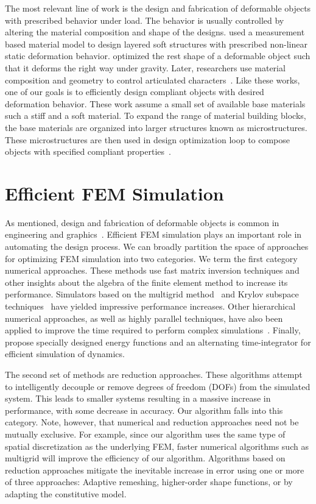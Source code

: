 The most relevant line of work is the design and fabrication of deformable objects with prescribed behavior under load.
The behavior is usually controlled by altering the material
composition and shape of the designs.
\citet{Bickel:2010:DAF} used a measurement based material model to design 
layered soft structures with prescribed non-linear static deformation behavior.
\citet{Chen:2014:ANM} optimized the rest shape of a deformable object such that 
it deforms the right way under gravity.
Later, researchers use material composition and geometry to control 
articulated characters~\citep{Bickel:2012,Skouras13Computational}.
Like these works, one of our goals is to efficiently design compliant objects 
with desired deformation behavior. These work assume a small set of available 
base materials such a stiff and a soft material.
To expand the range of material building blocks, the base materials are 
organized into larger structures known as microstructures.
These microstructures are then used in design optimization loop to 
compose objects with specified compliant 
properties~\citep{Schumacher:2015,Panetta:2015,Zhu:2017:TTO}.

\section{Efficient FEM Simulation}
As mentioned, design and fabrication of deformable objects is common in
engineering and graphics~\citep{bendsoe2004topology,Kou2012,McAdams2011}.
Efficient FEM simulation plays an important role in automating the design process.
We can broadly partition the space of approaches for
optimizing FEM simulation into two categories. We term the first
category numerical approaches. These methods use fast matrix inversion
techniques and other insights about the algebra of the finite
element method to increase its performance. Simulators based on
the multigrid method~\citep{Peraire1992,Zhu2010,McAdams2011}
and Krylov subspace techniques~\citep{Patterson2012}
have yielded impressive performance increases. Other hierarchical
numerical approaches, as well as highly parallel techniques, have
also been applied to improve the time required to perform complex
simulations~\citep{Farhat1991,Mandel1993}. Finally, \citet{Bouaziz:2014} propose specially designed energy functions and an
alternating time-integrator for efficient simulation of dynamics.

The second set of methods are reduction approaches. These algorithms
attempt to intelligently decouple or remove degrees of
freedom (DOFs) from the simulated system. This leads to smaller
systems resulting in a massive increase in performance, with some
decrease in accuracy. Our algorithm falls into this category. Note,
however, that numerical and reduction approaches need not be mutually exclusive.
For example, since our algorithm uses the same type of spatial discretization as the underlying FEM,
faster numerical algorithms such as multigrid will improve the efficiency of our algorithm.
Algorithms based on reduction approaches mitigate the inevitable increase in error using
one or more of three approaches: Adaptive remeshing, higher-order
shape functions, or by adapting the constitutive model.


